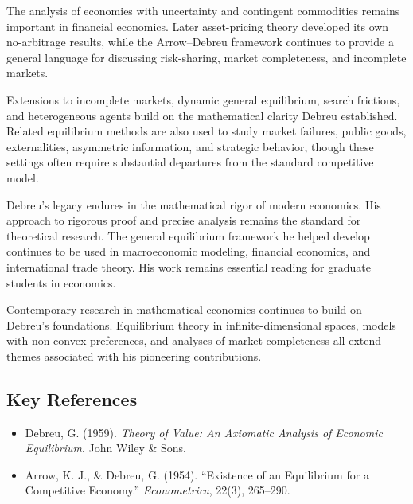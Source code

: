 The analysis of economies with uncertainty and contingent commodities remains
important in financial economics. Later asset-pricing theory developed its own
no-arbitrage results, while the Arrow--Debreu framework continues to provide a
general language for discussing risk-sharing, market completeness, and
incomplete markets.

Extensions to incomplete markets, dynamic general equilibrium, search
frictions, and heterogeneous agents build on the mathematical clarity Debreu
established. Related equilibrium methods are also used to study market
failures, public goods, externalities, asymmetric information, and strategic
behavior, though these settings often require substantial departures from the
standard competitive model.

Debreu's legacy endures in the mathematical rigor of modern economics. His approach to
rigorous proof and precise analysis remains the standard for theoretical research. The
general equilibrium framework he helped develop continues to be used in macroeconomic
modeling, financial economics, and international trade theory. His work remains essential
reading for graduate students in economics.

Contemporary research in mathematical economics continues to build on Debreu's
foundations. Equilibrium theory in infinite-dimensional spaces, models with
non-convex preferences, and analyses of market completeness all extend themes
associated with his pioneering contributions.

\subsection*{Key References}
\begin{itemize}
    \item Debreu, G. (1959). \textit{Theory of Value: An Axiomatic Analysis of Economic Equilibrium}. John Wiley \& Sons.
    \item Arrow, K. J., \& Debreu, G. (1954). ``Existence of an Equilibrium for a Competitive Economy.'' \textit{Econometrica}, 22(3), 265--290.
\end{itemize}
